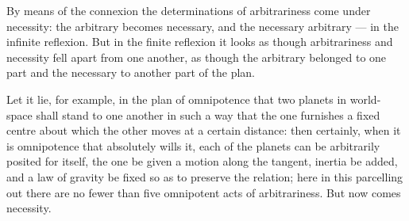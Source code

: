 \documentclass[12pt,a4paper]{book}
\begin{document}
By means of the connexion the determinations of arbitrariness come under necessity: the arbitrary
becomes necessary, and the necessary arbitrary --- in the infinite reflexion. But in the finite
reflexion it looks as though arbitrariness and necessity fell apart from one
another, as though the arbitrary belonged to one part and the necessary to another part of the plan.

Let it lie, for example, in the plan of omnipotence that two planets in world-space shall stand to
one another in such a way that the one furnishes a fixed centre about which the other moves at a
certain distance: then certainly, when it is omnipotence that absolutely wills it, each of the
planets can be arbitrarily posited for itself, the one be given a motion along the tangent, inertia
be added, and a law of gravity be fixed so as to preserve the relation; here in this parcelling out
there are no fewer than five omnipotent acts of arbitrariness. But now comes necessity.
\end{document}
